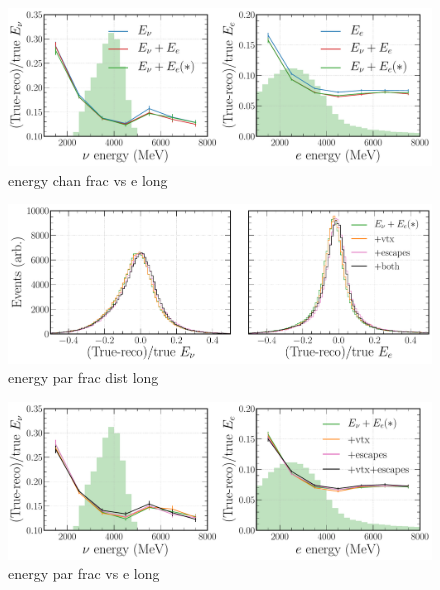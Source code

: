 \begin{figure} %
    \includegraphics[width=\textwidth]{diagrams/6-cvn/chipsnet/energy_chan_frac_vs_e.pdf}
    \caption[energy chan frac vs e short]
    {energy chan frac vs e long}
    \label{fig:energy_chan_frac_vs_e}
\end{figure}

\begin{figure} %
    \includegraphics[width=\textwidth]{diagrams/6-cvn/chipsnet/energy_par_frac_dist.pdf}
    \caption[energy par frac dist short]
    {energy par frac dist long}
    \label{fig:energy_par_frac_dist}
\end{figure}

\begin{figure} %
    \includegraphics[width=\textwidth]{diagrams/6-cvn/chipsnet/energy_par_frac_vs_e.pdf}
    \caption[energy par frac vs e short]
    {energy par frac vs e long}
    \label{fig:energy_par_frac_vs_e}
\end{figure}

